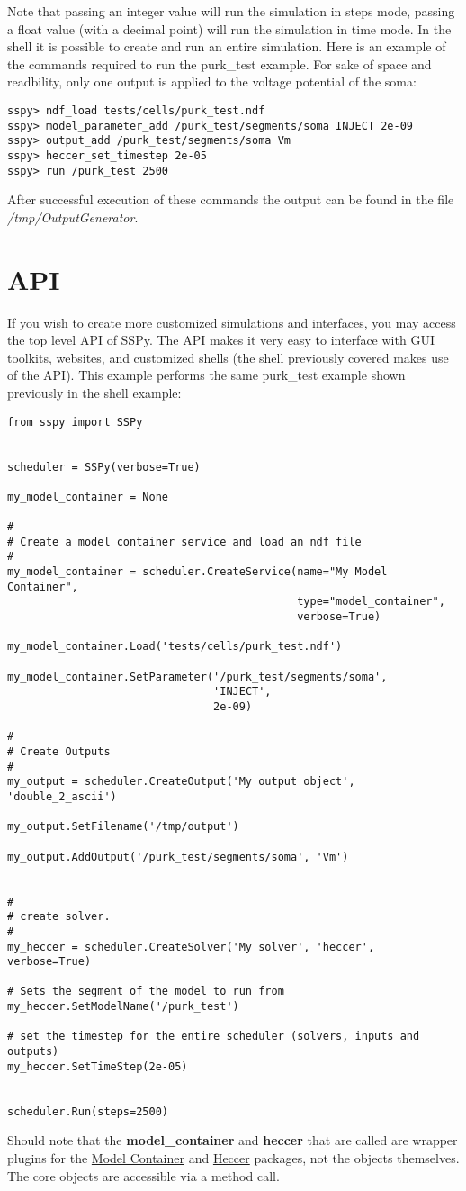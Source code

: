 \documentclass[12pt]{article}
\begin{document}
Note that passing an integer value will run the simulation in steps mode, passing a float value (with a decimal point) will run the simulation in time mode. In the shell it is possible to create and run an entire simulation. Here is an example of the commands required to run the purk\_test example. For sake of space and readbility, only one output is applied to the voltage potential of the soma:

\begin{verbatim}
sspy> ndf_load tests/cells/purk_test.ndf
sspy> model_parameter_add /purk_test/segments/soma INJECT 2e-09
sspy> output_add /purk_test/segments/soma Vm
sspy> heccer_set_timestep 2e-05
sspy> run /purk_test 2500
\end{verbatim}

After successful execution of these commands the output can be found
in the file {\it /tmp/OutputGenerator}.

\section*{API}

If you wish to create more customized simulations and interfaces, you may access the top level API of SSPy. The API makes it very easy to interface with GUI toolkits, websites, and customized shells (the shell previously covered makes use of the API). This example performs the same purk\_test example shown previously in the shell example:
	
\begin{verbatim}
from sspy import SSPy 


scheduler = SSPy(verbose=True)

my_model_container = None

#
# Create a model container service and load an ndf file
#    
my_model_container = scheduler.CreateService(name="My Model Container",
                                             type="model_container",
                                             verbose=True)

my_model_container.Load('tests/cells/purk_test.ndf')

my_model_container.SetParameter('/purk_test/segments/soma',
                                'INJECT',
                                2e-09)

#
# Create Outputs
#
my_output = scheduler.CreateOutput('My output object', 'double_2_ascii')

my_output.SetFilename('/tmp/output')

my_output.AddOutput('/purk_test/segments/soma', 'Vm')


#
# create solver.
#
my_heccer = scheduler.CreateSolver('My solver', 'heccer', verbose=True)

# Sets the segment of the model to run from
my_heccer.SetModelName('/purk_test')

# set the timestep for the entire scheduler (solvers, inputs and outputs)
my_heccer.SetTimeStep(2e-05)


scheduler.Run(steps=2500)

\end{verbatim}

Should note that the {\bf model\_container} and {\bf heccer} that are called are wrapper plugins for the \href{../model-container/model-container.tex}{Model Container} and \href{../heccer/heccer.tex}{Heccer} packages, not the objects themselves. The core objects are accessible via a method call. 
\end{document}
